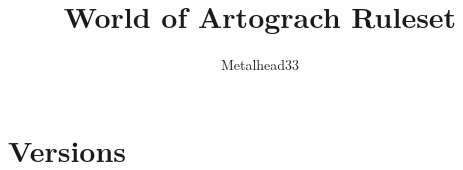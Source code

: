 \documentclass[tikz,openany,11pt,a4paper]{book}
\author{Metalhead33}
\title{World of Artograch Ruleset}
\begin{document}
\maketitle
\chapter*{Versions}

\tableofcontents

\end{document}

